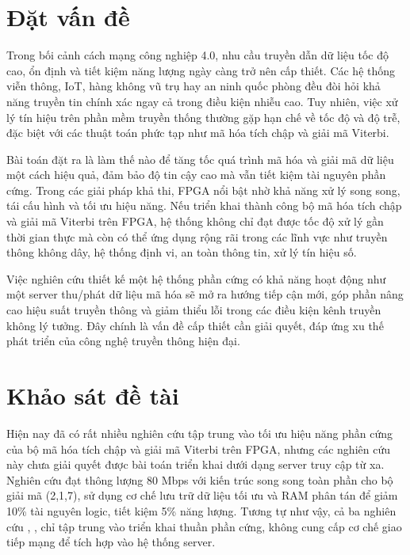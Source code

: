 \documentclass[../DoAn.tex]{subfiles}
\begin{document}
\section{Đặt vấn đề}

Trong bối cảnh cách mạng công nghiệp 4.0, nhu cầu truyền dẫn dữ liệu tốc độ cao, ổn định và tiết kiệm năng lượng ngày càng trở nên cấp thiết. Các hệ thống viễn thông, IoT, hàng không vũ trụ hay an ninh quốc phòng đều đòi hỏi khả năng truyền tin chính xác ngay cả trong điều kiện nhiễu cao. Tuy nhiên, việc xử lý tín hiệu trên phần mềm truyền thống thường gặp hạn chế về tốc độ và độ trễ, đặc biệt với các thuật toán phức tạp như mã hóa tích chập và giải mã Viterbi.

Bài toán đặt ra là làm thế nào để tăng tốc quá trình mã hóa và giải mã dữ liệu một cách hiệu quả, đảm bảo độ tin cậy cao mà vẫn tiết kiệm tài nguyên phần cứng. Trong các giải pháp khả thi, FPGA nổi bật nhờ khả năng xử lý song song, tái cấu hình và tối ưu hiệu năng. Nếu triển khai thành công bộ mã hóa tích chập và giải mã Viterbi trên FPGA, hệ thống không chỉ đạt được tốc độ xử lý gần thời gian thực mà còn có thể ứng dụng rộng rãi trong các lĩnh vực như truyền thông không dây, hệ thống định vi, an toàn thông tin, xử lý tín hiệu số.

Việc nghiên cứu thiết kế một hệ thống phần cứng có khả năng hoạt động như một server thu/phát dữ liệu mã hóa sẽ mở ra hướng tiếp cận mới, góp phần nâng cao hiệu suất truyền thông và giảm thiểu lỗi trong các điều kiện kênh truyền không lý tưởng. Đây chính là vấn đề cấp thiết cần giải quyết, đáp ứng xu thế phát triển của công nghệ truyền thông hiện đại.

\section{Khảo sát đề tài}
\label{section:Khảo sát đề tài}

Hiện nay đã có rất nhiều nghiên cứu tập trung vào tối ưu hiệu năng phần cứng của bộ mã hóa tích chập và giải mã Viterbi trên FPGA, nhưng các nghiên cứu này chưa giải quyết được bài toán triển khai dưới dạng server truy cập từ xa. Nghiên cứu \cite{sun_fpga_2012} đạt thông lượng 80 Mbps với kiến trúc song song toàn phần cho bộ giải mã (2,1,7), sử dụng cơ chế lưu trữ dữ liệu tối ưu và RAM phân tán để giảm 10\% tài nguyên logic, tiết kiệm 5\% năng lượng. Tương tự như vậy, cả ba nghiên cứu \cite{li_design_2012}, \cite{basavaraj_fpga_2023}, \cite{mandwale_different_2015} chỉ tập trung vào triển khai thuần phần cứng, không cung cấp cơ chế giao tiếp mạng để tích hợp vào hệ thống server.
\end{document}
